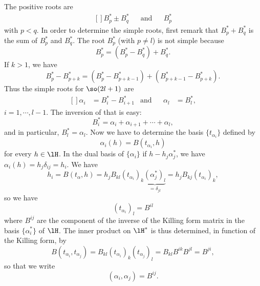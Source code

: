 The positive roots are
\begin{equation}
	\begin{aligned}[]
		B_p^*\pm B_q^*	&&	\text{and}	&& B_p^*
	\end{aligned}
\end{equation}
with $p<q$. In order to determine the simple roots, first remark that $B_p^*+B_q^*$ is the sum of $B_p^*$ and $B_q^*$. The root $B_p^*$ (with $p\neq l$) is not simple because
\begin{equation}
	B^*_p=(B^*_p-B^*_q)+B^*_q.
\end{equation}
If $k>1$, we have
\begin{equation}
	B_p^*-B^*_{p+k} = (B_p^*-B^*_{p+k-1} )+(B_{p+k-1}^*-B^*_{p+k} ).
\end{equation}
Thus the simple roots for $\so(2l+1)$ are
\begin{equation}			\label{EqRacinesSimplessol}
	\begin{aligned}[]
		\alpha_i &=B^*_i-B^*_{i+1}	&	\text{and}	&&	\alpha_l &=B^*_l,
	\end{aligned}
\end{equation}
$i=1,\cdots,l-1$. The inversion of that is easy:
\begin{equation}		\label{EqsonBenFnDesAlpha}
	B^*_i=\alpha_i+\alpha_{i+1}+\cdots+\alpha_l,
\end{equation}
and in particular, $B^*_l=\alpha_l$. Now we have to determine the basis $\{ t_{\alpha_i}\}$ defined by
\begin{equation}
	\alpha_i(h)=B(t_{\alpha_i},h)
\end{equation}
for every $h\in\lH$. In the dual basis of $\{\alpha_i\}$ if $h-h_j\alpha_j^*$, we have $\alpha_i(h)=h_j\delta_{ij}=h_i$. We have
\begin{equation}
	h_i=B(t_{\alpha},h)=h_jB_{kl}(t_{\alpha_i})_k\underbrace{(\alpha_j^*)_l}_{=\delta_{jl}}=h_jB_{kj}(t_{\alpha_i})_k,
\end{equation}
so we have
\begin{equation}
	(t_{\alpha_i})_l=B^{il}
\end{equation}
where $B^{ij}$ are the component of the inverse of the Killing form matrix in the basis $\{ \alpha_i^* \}$ of $\lH$. The inner product on $\lH^*$ is thus determined, in function of the Killing form, by
\begin{equation}
	B(t_{\alpha_i},t_{\alpha_j})=B_{kl}(t_{\alpha_i})_k(t_{\alpha_j})_l=B_{kl}B^{ik}B^{jl}=B^{ji},
\end{equation}
so that we write
\begin{equation}
	(\alpha_i,\alpha_j)=B^{ij}.
\end{equation}

